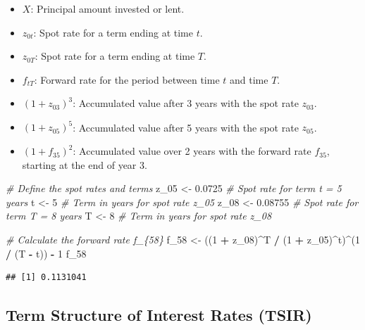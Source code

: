 \documentclass[
]{book}
\newenvironment{Shaded}{\begin{snugshade}}{\end{snugshade}}
\newcommand{\CommentTok}[1]{\textcolor[rgb]{0.56,0.35,0.01}{\textit{#1}}}
\newcommand{\DecValTok}[1]{\textcolor[rgb]{0.00,0.00,0.81}{#1}}
\newcommand{\FloatTok}[1]{\textcolor[rgb]{0.00,0.00,0.81}{#1}}
\newcommand{\NormalTok}[1]{#1}
\newcommand{\OtherTok}[1]{\textcolor[rgb]{0.56,0.35,0.01}{#1}}
\newcommand{\SpecialCharTok}[1]{\textcolor[rgb]{0.81,0.36,0.00}{\textbf{#1}}}
\providecommand{\tightlist}{%
  \setlength{\itemsep}{0pt}\setlength{\parskip}{0pt}}
\begin{document}
\begin{itemize}
\tightlist
\item
  \(X\): Principal amount invested or lent.
\item
  \(z_{0t}\): Spot rate for a term ending at time \(t\).
\item
  \(z_{0T}\): Spot rate for a term ending at time \(T\).
\item
  \(f_{tT}\): Forward rate for the period between time \(t\) and time
  \(T\).
\item
  \((1+z_{03})^3\): Accumulated value after 3 years with the spot rate
  \(z_{03}\).
\item
  \((1+z_{05})^5\): Accumulated value after 5 years with the spot rate
  \(z_{05}\).
\item
  \((1+f_{35})^2\): Accumulated value over 2 years with the forward rate
  \(f_{35}\), starting at the end of year 3.
\end{itemize}

\begin{Shaded}
\begin{Highlighting}[]
\CommentTok{\# Define the spot rates and terms}
\NormalTok{z\_05 }\OtherTok{\textless{}{-}} \FloatTok{0.0725}  \CommentTok{\# Spot rate for term t = 5 years}
\NormalTok{t    }\OtherTok{\textless{}{-}} \DecValTok{5}       \CommentTok{\# Term in years for spot rate z\_05}
\NormalTok{z\_08 }\OtherTok{\textless{}{-}} \FloatTok{0.08755} \CommentTok{\# Spot rate for term T = 8 years}
\NormalTok{T    }\OtherTok{\textless{}{-}} \DecValTok{8}       \CommentTok{\# Term in years for spot rate z\_08}

\CommentTok{\# Calculate the forward rate f\_\{58\}}
\NormalTok{f\_58 }\OtherTok{\textless{}{-}}\NormalTok{ ((}\DecValTok{1} \SpecialCharTok{+}\NormalTok{ z\_08)}\SpecialCharTok{\^{}}\NormalTok{T }\SpecialCharTok{/}\NormalTok{ (}\DecValTok{1} \SpecialCharTok{+}\NormalTok{ z\_05)}\SpecialCharTok{\^{}}\NormalTok{t)}\SpecialCharTok{\^{}}\NormalTok{(}\DecValTok{1} \SpecialCharTok{/}\NormalTok{ (T }\SpecialCharTok{{-}}\NormalTok{ t)) }\SpecialCharTok{{-}} \DecValTok{1}
\NormalTok{f\_58}
\end{Highlighting}
\end{Shaded}

\begin{verbatim}
## [1] 0.1131041
\end{verbatim}

\hypertarget{term-structure-of-interest-rates-tsir}{%
\subsection{Term Structure of Interest Rates
(TSIR)}\label{term-structure-of-interest-rates-tsir}}
\end{document}
